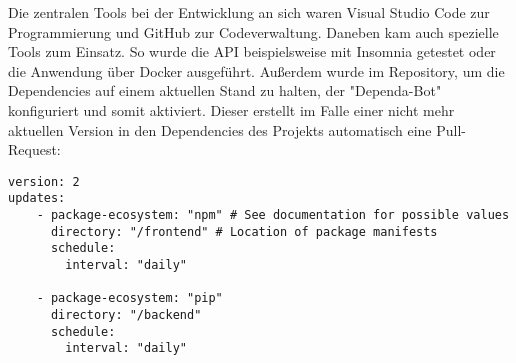 Die zentralen Tools bei der Entwicklung an sich waren Visual Studio Code zur Programmierung und GitHub zur Codeverwaltung. Daneben kam auch spezielle Tools zum Einsatz. So wurde die API beispielsweise mit Insomnia getestet oder die Anwendung über Docker ausgeführt. Außerdem wurde im Repository, um die  Dependencies auf einem aktuellen Stand zu halten, der "Dependa-Bot" konfiguriert und somit aktiviert. Dieser erstellt im Falle einer nicht mehr aktuellen Version in den Dependencies des Projekts automatisch eine Pull-Request:

\begin{lstlisting}
version: 2
updates:
	- package-ecosystem: "npm" # See documentation for possible values
	  directory: "/frontend" # Location of package manifests
	  schedule:
		interval: "daily"
	
	- package-ecosystem: "pip"
	  directory: "/backend"
	  schedule:
		interval: "daily"
\end{lstlisting}



